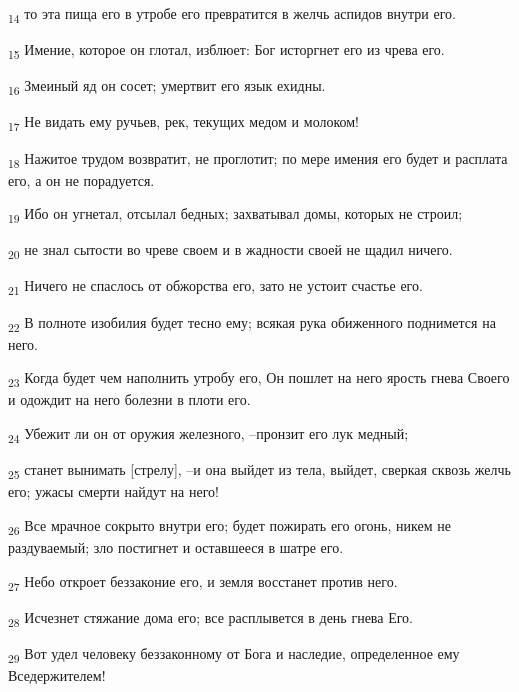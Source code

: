 \begin{tcolorbox}
\textsubscript{14} то эта пища его в утробе его превратится в желчь аспидов внутри его.
\end{tcolorbox}
\begin{tcolorbox}
\textsubscript{15} Имение, которое он глотал, изблюет: Бог исторгнет его из чрева его.
\end{tcolorbox}
\begin{tcolorbox}
\textsubscript{16} Змеиный яд он сосет; умертвит его язык ехидны.
\end{tcolorbox}
\begin{tcolorbox}
\textsubscript{17} Не видать ему ручьев, рек, текущих медом и молоком!
\end{tcolorbox}
\begin{tcolorbox}
\textsubscript{18} Нажитое трудом возвратит, не проглотит; по мере имения его будет и расплата его, а он не порадуется.
\end{tcolorbox}
\begin{tcolorbox}
\textsubscript{19} Ибо он угнетал, отсылал бедных; захватывал домы, которых не строил;
\end{tcolorbox}
\begin{tcolorbox}
\textsubscript{20} не знал сытости во чреве своем и в жадности своей не щадил ничего.
\end{tcolorbox}
\begin{tcolorbox}
\textsubscript{21} Ничего не спаслось от обжорства его, зато не устоит счастье его.
\end{tcolorbox}
\begin{tcolorbox}
\textsubscript{22} В полноте изобилия будет тесно ему; всякая рука обиженного поднимется на него.
\end{tcolorbox}
\begin{tcolorbox}
\textsubscript{23} Когда будет чем наполнить утробу его, Он пошлет на него ярость гнева Своего и одождит на него болезни в плоти его.
\end{tcolorbox}
\begin{tcolorbox}
\textsubscript{24} Убежит ли он от оружия железного, --пронзит его лук медный;
\end{tcolorbox}
\begin{tcolorbox}
\textsubscript{25} станет вынимать [стрелу], --и она выйдет из тела, выйдет, сверкая сквозь желчь его; ужасы смерти найдут на него!
\end{tcolorbox}
\begin{tcolorbox}
\textsubscript{26} Все мрачное сокрыто внутри его; будет пожирать его огонь, никем не раздуваемый; зло постигнет и оставшееся в шатре его.
\end{tcolorbox}
\begin{tcolorbox}
\textsubscript{27} Небо откроет беззаконие его, и земля восстанет против него.
\end{tcolorbox}
\begin{tcolorbox}
\textsubscript{28} Исчезнет стяжание дома его; все расплывется в день гнева Его.
\end{tcolorbox}
\begin{tcolorbox}
\textsubscript{29} Вот удел человеку беззаконному от Бога и наследие, определенное ему Вседержителем!
\end{tcolorbox}

